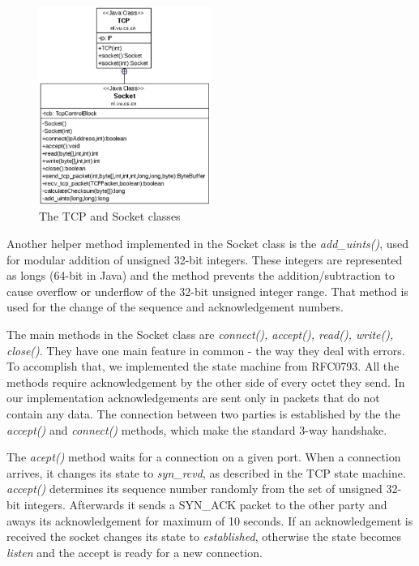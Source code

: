 \documentclass{article}
\begin{document}
\begin{figure}[h!]
 \centering
 \includegraphics[width=0.5\textwidth]{images/tcp_socket}
 \caption{The TCP and Socket classes}
  \label{fig:socket}
\end{figure}

Another helper method implemented in the Socket class is the \textit{add\_uints()}, used for modular addition of unsigned 32-bit
integers. These integers are represented as longs (64-bit in Java) and the method prevents the addition/subtraction to
cause overflow or underflow of the 32-bit unsigned integer range. That method is used for the change of the sequence
and acknowledgement numbers. 

The main methods in the Socket class are \textit{connect(), accept(), read(), write(), close()}. They have one main feature
in common - the way they deal with errors. To accomplish that, we implemented the state machine from RFC0793. All the methods
require acknowledgement by the other side of every octet they send. In our implementation acknowledgements are sent only in
packets that do not contain any data. The connection between two parties is established by the the \textit{accept()} and
\textit{connect()} methods, which make the standard 3-way handshake.



The \textit{acept()} method waits for a connection on a given port. When a connection arrives, it changes its state to \textit{syn\_rcvd},
as described in the TCP state machine. \textit{accept()} determines its sequence number randomly from the set of unsigned 32-bit integers.
Afterwards it sends a SYN\_ACK packet to the other party and aways its acknowledgement for maximum of 10 seconds. If an acknowledgement
is received the socket changes its state to \textit{established}, otherwise the state becomes \textit{listen} and the accept is ready
for a new connection.
\end{document}
